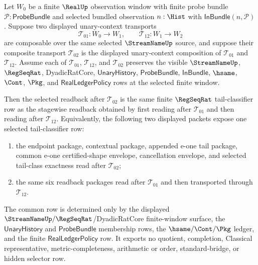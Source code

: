 \begin{theorem}
\label{thm:real-selected-transport-readback-functoriality}
Let $W_0$ be a finite $\RealUp$ observation window with finite probe bundle
$\mathcal{P}:\mathsf{ProbeBundle}$ and selected bundled observation
$n:\Hist$ with $\mathsf{InBundle}(n,\mathcal{P})$. Suppose two displayed
unary-context transports
$$
\mathcal{T}_{01}:W_0\to W_1,\qquad
\mathcal{T}_{12}:W_1\to W_2
$$
are composable over the same selected $\StreamNameUp$ source, and suppose their
composite transport $\mathcal{T}_{02}$ is the displayed unary-context
composition of $\mathcal{T}_{01}$ and $\mathcal{T}_{12}$. Assume each of
$\mathcal{T}_{01}$, $\mathcal{T}_{12}$, and $\mathcal{T}_{02}$ preserves the
visible $\StreamNameUp$, $\RegSeqRat$, DyadicRatCore,
$\mathsf{UnaryHistory}$, $\mathsf{ProbeBundle}$, $\mathsf{InBundle}$,
$\hsame$, $\Cont$, $\Pkg$, and $\mathsf{RealLedgerPolicy}$ rows at the selected
finite window.

Then the selected readback after $\mathcal{T}_{02}$ is the same finite
$\RegSeqRat$ tail-classifier row as the stagewise readback obtained by first
reading after $\mathcal{T}_{01}$ and then reading after $\mathcal{T}_{12}$.
Equivalently, the following two displayed packets expose one selected
tail-classifier row:
\begin{enumerate}
  \item the endpoint package, contextual package, appended e-one tail package,
  common e-one certified-shape envelope, cancellation envelope, and selected
  tail-class exactness read after $\mathcal{T}_{02}$;
  \item the same six readback packages read after $\mathcal{T}_{01}$ and then
  transported through $\mathcal{T}_{12}$.
\end{enumerate}
The common row is determined only by the displayed
$\StreamNameUp/\RegSeqRat$/DyadicRatCore finite-window surface, the
$\mathsf{UnaryHistory}$ and $\mathsf{ProbeBundle}$ membership rows, the
$\hsame/\Cont/\Pkg$ ledger, and the finite $\mathsf{RealLedgerPolicy}$ row. It
exports no quotient, completion, Classical representative,
metric-completeness, arithmetic or order, standard-bridge, or hidden selector
row.
\end{theorem}
